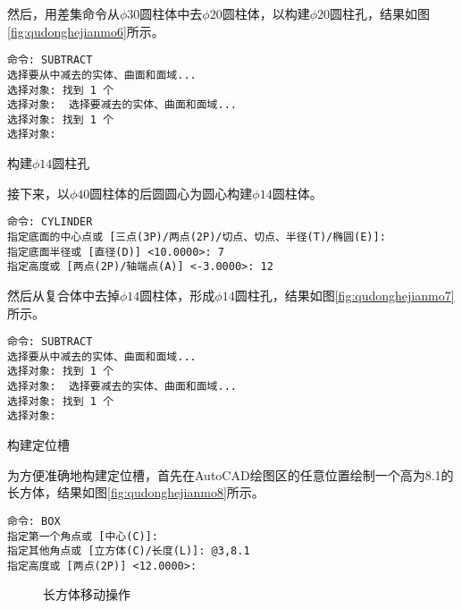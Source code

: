 \begin{procedure}
然后，用差集命令从$\phi 30$圆柱体中去$\phi 20$圆柱体，以构建$\phi 20$圆柱孔，结果如图\ref{fig:qudonghejianmo6}所示。

\begin{lstlisting}
命令: SUBTRACT
选择要从中减去的实体、曲面和面域...
选择对象: 找到 1 个
选择对象:  选择要减去的实体、曲面和面域...
选择对象: 找到 1 个
选择对象:
\end{lstlisting}

\item 构建$\phi 14$圆柱孔

\begin{figure}[htbp]
\centering
\begin{floatrow}[2]
\end{floatrow}
\end{figure}

接下来，以$\phi 40$圆柱体的后圆圆心为圆心构建$\phi 14$圆柱体。
\begin{lstlisting}
命令: CYLINDER
指定底面的中心点或 [三点(3P)/两点(2P)/切点、切点、半径(T)/椭圆(E)]:
指定底面半径或 [直径(D)] <10.0000>: 7
指定高度或 [两点(2P)/轴端点(A)] <-3.0000>: 12
\end{lstlisting}

然后从复合体中去掉$\phi 14$圆柱体，形成$\phi 14$圆柱孔，结果如图\ref{fig:qudonghejianmo7}所示。
\begin{lstlisting}
命令: SUBTRACT
选择要从中减去的实体、曲面和面域...
选择对象: 找到 1 个
选择对象:  选择要减去的实体、曲面和面域...
选择对象: 找到 1 个
选择对象:
\end{lstlisting}

\item 构建定位槽

为方便准确地构建定位槽，首先在AutoCAD绘图区的任意位置绘制一个高为8.1的长方体，结果如图\ref{fig:qudonghejianmo8}所示。
\begin{lstlisting}
命令: BOX
指定第一个角点或 [中心(C)]:
指定其他角点或 [立方体(C)/长度(L)]: @3,8.1
指定高度或 [两点(2P)] <12.0000>:
\end{lstlisting}

\begin{figure}[htbp]
\centering
{}\hspace{60pt}
\caption{长方体移动操作}
\end{figure}


\end{procedure}
